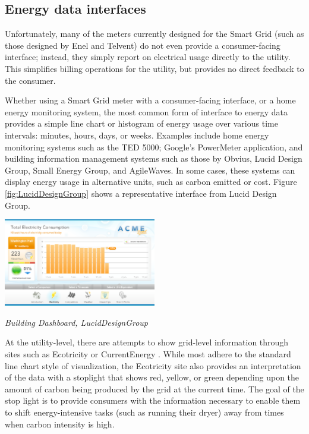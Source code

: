 \subsection{Energy data interfaces}

Unfortunately, many of the meters currently designed for the Smart Grid
(such as those designed by Enel and Telvent) do not even provide a
consumer-facing interface; instead, they simply report on electrical usage
directly to the utility.  This simplifies billing operations for the
utility, but provides no direct feedback to the consumer.

Whether using a Smart Grid meter with a consumer-facing interface, or a
home energy monitoring system, the most common form of interface to energy
data provides a simple line chart or histogram of energy usage over various
time intervals: minutes, hours, days, or weeks.  Examples include home
energy monitoring systems such as the TED 5000; Google's PowerMeter
application, and building information management systems such as those by
Obvius, Lucid Design Group, Small Energy Group, and AgileWaves. In some
cases, these systems can display energy usage in alternative units, such as
carbon emitted or cost.  Figure \ref{fig:LucidDesignGroup} shows a
representative interface from Lucid Design Group.

\begin{floatingfigure}[l]{3.25in}
  \center
  \includegraphics[width=0.5\textwidth]{luciddesigngroup.3.eps}
  \caption{\em \small Building Dashboard, LucidDesignGroup}
  \label{fig:LucidDesignGroup}
\end{floatingfigure} 


At the utility-level, there are attempts to show grid-level information
through sites such as Ecotricity \cite{Ecotricity} or CurrentEnergy
\cite{CurrentEnergy}.  While most adhere to the standard line chart style
of visualization, the Ecotricity site also provides an interpretation of
the data with a stoplight that shows red, yellow, or green depending upon
the amount of carbon being produced by the grid at the current time.  The
goal of the stop light is to provide consumers with the information
necessary to enable them to shift energy-intensive tasks (such as running
their dryer) away from times when carbon intensity is high.

